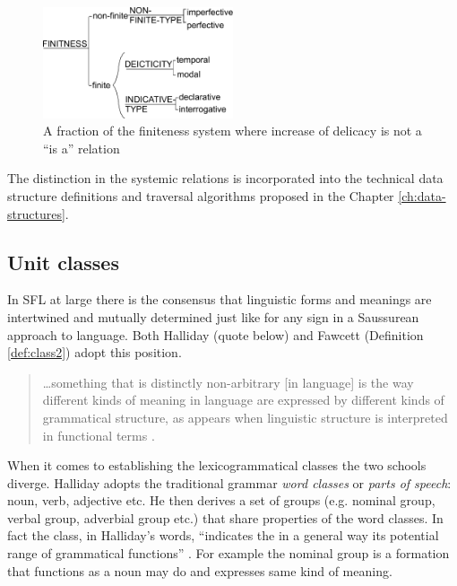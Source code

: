 \begin{figure}[!ht]
    \centering
    \includegraphics[width=0.5\textwidth]{Figures/SFL-grammar/finitness-system.pdf}
    \caption{A fraction of the finiteness system where increase of delicacy is not a ``is a'' relation}
    \label{fig:finitness-fraction}
\end{figure}

The distinction in the systemic relations is incorporated into the technical data structure definitions and traversal algorithms proposed in the Chapter \ref{ch:data-structures}.

\subsection{Unit classes}
\label{sec:unit-classes}

In SFL at large there is the consensus that linguistic forms and meanings are intertwined and mutually determined just like for any sign in a Saussurean approach to language. Both Halliday (quote below) and Fawcett (Definition \ref{def:class2}) adopt this position. 

\begin{quotation}
	\dots something that is distinctly non-arbitrary [in language] is the way different kinds of meaning in language are expressed by different kinds of grammatical structure, as appears when linguistic structure is interpreted in functional terms \citep{Halliday2003-Ideas-about-language}.
\end{quotation}

When it comes to establishing the lexicogrammatical classes the two schools diverge. Halliday adopts the traditional grammar \textit{word classes} or \textit{parts of speech}: noun, verb, adjective etc. He then derives a set of groups (e.g. nominal group, verbal group, adverbial group etc.) that share properties of the word classes. In fact the class, in Halliday's words, ``indicates the in a general way its potential range of grammatical functions'' \citep[76]{Halliday2013}. For example the nominal group is a formation that functions as a noun may do and expresses same kind of meaning. 


